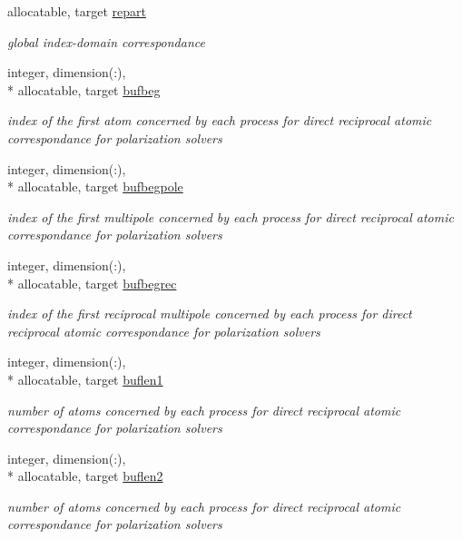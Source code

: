 \begin{DoxyCompactItemize}
allocatable, target \hyperlink{classdomdec_aeab8c3ef2b14a507aa871f5e49d4a5f6}{repart}
\begin{DoxyCompactList}\small\item\em global index-\/domain correspondance \end{DoxyCompactList}\item 
integer, dimension(\-:), \\*
allocatable, target \hyperlink{classdomdec_ae9894e09bab77f6e5c9bd85833d955b9}{bufbeg}
\begin{DoxyCompactList}\small\item\em index of the first atom concerned by each process for direct reciprocal atomic correspondance for polarization solvers \end{DoxyCompactList}\item 
integer, dimension(\-:), \\*
allocatable, target \hyperlink{classdomdec_ade41bd5550ac0d2a5a7af786b4a7607e}{bufbegpole}
\begin{DoxyCompactList}\small\item\em index of the first multipole concerned by each process for direct reciprocal atomic correspondance for polarization solvers \end{DoxyCompactList}\item 
integer, dimension(\-:), \\*
allocatable, target \hyperlink{classdomdec_af1a239b39d8aba8af456077bf0fe2eb9}{bufbegrec}
\begin{DoxyCompactList}\small\item\em index of the first reciprocal multipole concerned by each process for direct reciprocal atomic correspondance for polarization solvers \end{DoxyCompactList}\item 
integer, dimension(\-:), \\*
allocatable, target \hyperlink{classdomdec_a8ad5403cf1da77b23f0dc43e220a8f1d}{buflen1}
\begin{DoxyCompactList}\small\item\em number of atoms concerned by each process for direct reciprocal atomic correspondance for polarization solvers \end{DoxyCompactList}\item 
integer, dimension(\-:), \\*
allocatable, target \hyperlink{classdomdec_adde65e323deb64b0d4531cf1d930b4a9}{buflen2}
\begin{DoxyCompactList}\small\item\em number of atoms concerned by each process for direct reciprocal atomic correspondance for polarization solvers \end{DoxyCompactList}\item 

\end{DoxyCompactItemize}
